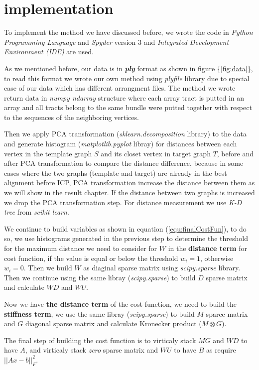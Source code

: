 \documentclass[../structure.tex]{subfiles}
\begin{document}
\chapter{implementation}
To implement the method we have discussed before, we wrote the code in \textit{Python Programming Language} and \textit{Spyder} version 3 and \textit{Integrated Development Environment (IDE)} are used.

As we mentioned before, our data is in \textit{\textbf{ply}} format as shown in figure \{\ref{fig:data}\}, to read this format we wrote our own method using \textit{plyfile} library due to special case of our data which has different arrangment files. The method we wrote return data in \textit{numpy ndarray} structure where each array tract is putted in an array and all tracts belong to the same bundle were putted together with respect to the sequences of the neighboring vertices.

Then we apply PCA transformation (\textit{sklearn.decomposition} library) to the data and generate histogram (\textit{matplotlib.pyplot} libray) for distances between each vertex in the template graph $S$ and its closet vertex in target graph $T$, before and after PCA transformation to compare the distance difference, because in some cases where the two graphs (template and target) are already in the best alignment before ICP, PCA transformation increase the distance between them as we will show in the result chapter. If the distance between two graphs is increased we drop the PCA transformation step. For distance measurement we use \textit{K-D tree} from \textit{scikit learn}. 

We continue to build variables as shown in equation (\ref{equ:finalCostFun}), to do so, we use histograms generated in the previous step to determine the threshold for the maximum distance we need to consider for $W$ in the \textbf{distance term} for cost function, if the value is equal or below the threshold $w_{i} = 1$, otherwise $w_{i} = 0$. Then we build $W$ as diaginal sparse matrix using \textit{scipy.sparse} library. Then we continue using the same libray (\textit{scipy.sparse}) to build $D$ sparse matrix and calculate $WD$ and $WU$.

Now we have \textbf{the distance term} of the cost function, we need to build the \textbf{stiffness term}, we use the same libray (\textit{scipy.sparse}) to build $M$ sparce matrix and $G$ diagonal sparse matrix and calculate Kronecker product ($M\otimes G$).

The final step of building the cost function is to virticaly stack $MG$ and $WD$ to have $A$, and virticaly stack \textit{zero} sparse matrix and $WU$ to have $B$ as require $||Ax-b||_{F}^2$.
\end{document}
